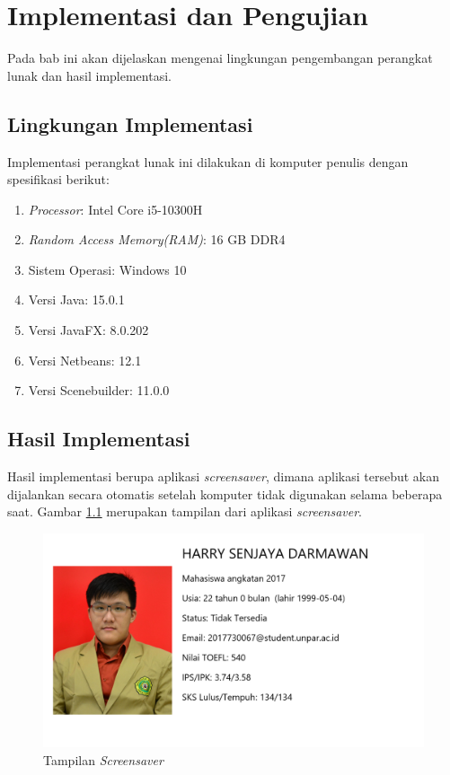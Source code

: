 \chapter{Implementasi dan Pengujian}
\label{chap:implementasi&pengujian}


Pada bab ini akan dijelaskan mengenai lingkungan pengembangan perangkat lunak dan hasil
implementasi.

\section{Lingkungan Implementasi}
\label{lingkungan_implementasi}
Implementasi perangkat lunak ini dilakukan di komputer penulis dengan spesifikasi berikut:
\begin{enumerate}
    \item \textit{Processor}: Intel Core i5-10300H
    \item \textit{Random Access Memory(RAM)}: 16 GB DDR4
    \item Sistem Operasi: Windows 10
    \item Versi Java: 15.0.1
    \item Versi JavaFX: 8.0.202
    \item Versi Netbeans: 12.1
    \item Versi Scenebuilder: 11.0.0
\end{enumerate}

\section{Hasil Implementasi}
Hasil implementasi berupa aplikasi \textit{screensaver}, dimana aplikasi tersebut akan dijalankan secara otomatis setelah komputer tidak digunakan selama beberapa saat. Gambar \ref{fig:5_hasil} merupakan tampilan dari aplikasi \textit{screensaver}.

\begin{figure}[H]
	\centering
	\includegraphics[scale=0.3]{Gambar/hasil.png}
	\caption{Tampilan \textit{Screensaver}}
	\label{fig:5_hasil}
\end{figure}